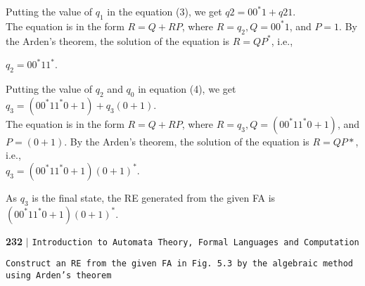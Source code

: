 \documentclass[9pt]{article}
\begin{document}
 \hspace*{0.5cm} Putting the value of $q_1$ in the equation (3), we get $q2 = 00^*1 + q21$.\\
 \hspace*{0.5cm} The equation is in the form $R = Q + RP$, where $R = q_2, Q = 00^*1$, and $P = 1$. By the Arden’s theorem,
the solution of the equation is $R = QP^*$, i.e.,\\

 \vspace*{0.1cm}

\hspace*{4.5cm} $q_2 = 00^*11^*$.\\
 \vspace*{0.1cm}

 \hspace*{0.5cm} Putting the value of $q_2$ and $q_0$ in equation (4), we get\\

 \vspace*{0.1cm}
\hspace*{3cm} $q_3 = (00^*11^*0 + 1) + q_3 (0 + 1)$.\\

 \vspace*{0.1cm}
The equation is in the form $R = Q + RP$, where $R = q_3, Q = (00^*11^*0 + 1)$, and $P = (0 + 1)$. By the
Arden’s theorem, the solution of the equation is $R = QP*$, i.e.,\\

 \vspace*{0.1cm}
\hspace*{3.2cm} $q_3 = (00^*11^*0 + 1) (0 + 1)^*$.\\
 \vspace*{0.1cm}

 \hspace*{0.5cm} As $q_3$ is the final state, the RE generated from the given FA is $(00^*11^*0 + 1) (0 + 1)^*$.\\

\newpage
\begin{flushleft}
    \textbf{232}\hspace*{0.1cm} \textbf{$|$} \hspace*{0.1cm} \texttt{Introduction to Automata Theory, Formal Languages and Computation}
  \end{flushleft}

\vspace*{0.3cm}
\hspace*{0.1cm} \texttt{\small{Construct an RE from the given FA in Fig. 5.3 by the algebraic method using Arden’s theorem}}\\
\end{document}
